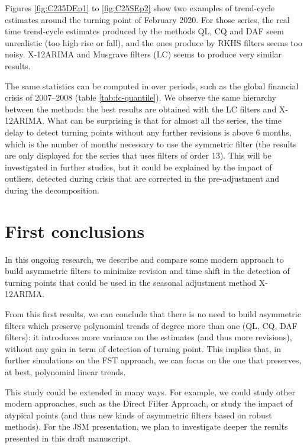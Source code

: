 \documentclass[fleqn,10pt]{latex/stylish_article} %
\newcommand\1{\mathds{1}}
\begin{document}
Figures \ref{fig:C235DEp1} to \ref{fig:C25SEp2} show two examples of trend-cycle estimates around the turning point of February 2020. For those series, the real time trend-cycle estimates produced by the methods QL, CQ and DAF seem unrealistic (too high rise or fall), and the ones produce by RKHS filters seems too noisy. X-12ARIMA and Musgrave filters (LC) seems to produce very similar results.

The same statistics can be computed in over periods, such as the global financial crisis of 2007--2008 (table \ref{tab:fc-quantile}). We observe the same hierarchy between the methods: the best results are obtained with the LC filters and X-12ARIMA. What can be surprising is that for almost all the series, the time delay to detect turning points without any further revisions is above 6 months, which is the number of months necessary to use the symmetric filter (the results are only displayed for the series that uses filters of order 13). This will be investigated in further studies, but it could be explained by the impact of outliers, detected during crisis that are corrected in the pre-adjustment and during the decomposition.

\hypertarget{first-conclusions}{%
\section{First conclusions}\label{first-conclusions}}

In this ongoing research, we describe and compare some modern approach to build asymmetric filters to minimize revision and time shift in the detection of turning points that could be used in the seasonal adjustment method X-12ARIMA.

From this first results, we can conclude that there is no need to build asymmetric filters which preserve polynomial trends of degree more than one (QL, CQ, DAF filters): it introduces more variance on the estimates (and thus more revisions), without any gain in term of detection of turning point. This implies that, in further simulations on the FST approach, we can focus on the one that preserves, at best, polynomial linear trends.

This study could be extended in many ways. For example, we could study other modern approaches, such as the Direct Filter Approach, or study the impact of atypical points (and thus new kinds of asymmetric filters based on robust methods). For the JSM presentation, we plan to investigate deeper the results presented in this draft manuscript.
\end{document}

